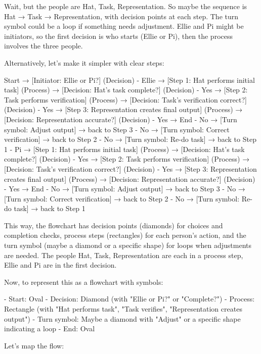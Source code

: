 Wait, but the people are Hat, Task, Representation. So maybe the sequence is Hat → Task → Representation, with decision points at each step. The turn symbol could be a loop if something needs adjustment. Ellie and Pi might be initiators, so the first decision is who starts (Ellie or Pi), then the process involves the three people.

Alternatively, let's make it simpler with clear steps:

Start → [Initiator: Ellie or Pi?] (Decision)
  - Ellie → [Step 1: Hat performs initial task] (Process)
    → [Decision: Hat's task complete?] (Decision)
      - Yes → [Step 2: Task performs verification] (Process)
        → [Decision: Task's verification correct?] (Decision)
          - Yes → [Step 3: Representation creates final output] (Process)
            → [Decision: Representation accurate?] (Decision)
              - Yes → End
              - No → [Turn symbol: Adjust output] → back to Step 3
          - No → [Turn symbol: Correct verification] → back to Step 2
      - No → [Turn symbol: Re-do task] → back to Step 1
  - Pi → [Step 1: Hat performs initial task] (Process)
    → [Decision: Hat's task complete?] (Decision)
      - Yes → [Step 2: Task performs verification] (Process)
        → [Decision: Task's verification correct?] (Decision)
          - Yes → [Step 3: Representation creates final output] (Process)
            → [Decision: Representation accurate?] (Decision)
              - Yes → End
              - No → [Turn symbol: Adjust output] → back to Step 3
          - No → [Turn symbol: Correct verification] → back to Step 2
      - No → [Turn symbol: Re-do task] → back to Step 1

This way, the flowchart has decision points (diamonds) for choices and completion checks, process steps (rectangles) for each person's action, and the turn symbol (maybe a diamond or a specific shape) for loops when adjustments are needed. The people Hat, Task, Representation are each in a process step, Ellie and Pi are in the first decision. 

Now, to represent this as a flowchart with symbols:

- Start: Oval
- Decision: Diamond (with "Ellie or Pi?" or "Complete?")
- Process: Rectangle (with "Hat performs task", "Task verifies", "Representation creates output")
- Turn symbol: Maybe a diamond with "Adjust" or a specific shape indicating a loop
- End: Oval

Let's map the flow:

